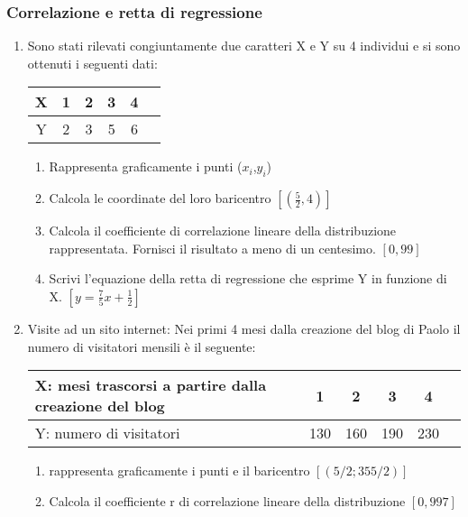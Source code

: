 \subsubsection{Correlazione e retta di regressione}
\begin{enumerate}
        \item Sono stati rilevati congiuntamente due caratteri X e Y su 4 
individui e si sono ottenuti i seguenti dati:\\
        \begin{tabular}{|c|c|c|c|c|c|}
        \hline  
                X&      1&      2&      3&      4\\
                        \hline  
                Y&      2&      3&      5&      6\\
                        \hline  
        \end{tabular}
        \begin{enumerate}
                \item Rappresenta graficamente i punti ($x_i$,$y_i$)
                \item Calcola le coordinate del loro baricentro \hfill 
$[(\frac{5}{2},4)]$
                \item Calcola il coefficiente di correlazione lineare della 
distribuzione rappresentata. Fornisci il risultato a meno di un centesimo. 
\hfill $[0,99]$
                \item Scrivi l'equazione della retta di regressione che 
esprime Y in funzione di X. \hfill $[y=\frac{7}{5}x+\frac{1}{2}]$
        \end{enumerate}
\item Visite ad un sito internet: Nei primi 4 mesi dalla creazione del blog 
di Paolo il numero di visitatori mensili è il seguente:\\
\begin{tabular}{|p{4cm}|c|c|c|c|c|}
        \hline
        X: mesi trascorsi a partire dalla creazione del blog&   1&      
2&      3&      4\\
        \hline
        Y: numero di visitatori&        130&    160&    190&    230\\
        \hline  
\end{tabular}
\begin{enumerate}
        \item rappresenta graficamente i punti e il baricentro \hfill 
$[(5/2; 355/2)]$
        \item Calcola il coefficiente r di correlazione lineare della 
distribuzione \hfill $[0,997]$

\end{enumerate}
\end{enumerate}
